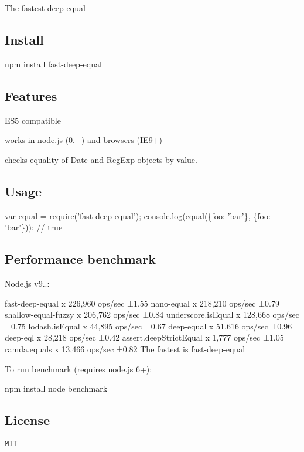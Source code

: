 The fastest deep equal

\href{https://travis-ci.org/epoberezkin/fast-deep-equal}{\tt } \href{http://badge.fury.io/js/fast-deep-equal}{\tt } \href{https://coveralls.io/github/epoberezkin/fast-deep-equal?branch=master}{\tt }

\subsection*{Install}


\begin{DoxyCode}
npm install fast-deep-equal
\end{DoxyCode}


\subsection*{Features}


\begin{DoxyItemize}
\item E\+S5 compatible
\item works in node.\+js (0.+) and browsers (I\+E9+)
\item checks equality of \mbox{\hyperlink{classDate}{Date}} and Reg\+Exp objects by value.
\end{DoxyItemize}

\subsection*{Usage}


\begin{DoxyCode}
var equal = require('fast-deep-equal');
console.log(equal(\{foo: 'bar'\}, \{foo: 'bar'\})); // true
\end{DoxyCode}


\subsection*{Performance benchmark}

Node.\+js v9..\+:


\begin{DoxyCode}
fast-deep-equal x 226,960 ops/sec ±1.55%
nano-equal x 218,210 ops/sec ±0.79%
shallow-equal-fuzzy x 206,762 ops/sec ±0.84%
underscore.isEqual x 128,668 ops/sec ±0.75%
lodash.isEqual x 44,895 ops/sec ±0.67%
deep-equal x 51,616 ops/sec ±0.96%
deep-eql x 28,218 ops/sec ±0.42%
assert.deepStrictEqual x 1,777 ops/sec ±1.05%
ramda.equals x 13,466 ops/sec ±0.82%
The fastest is fast-deep-equal
\end{DoxyCode}


To run benchmark (requires node.\+js 6+)\+:


\begin{DoxyCode}
npm install
node benchmark
\end{DoxyCode}


\subsection*{License}

\href{https://github.com/epoberezkin/fast-deep-equal/blob/master/LICENSE}{\tt M\+IT} 
